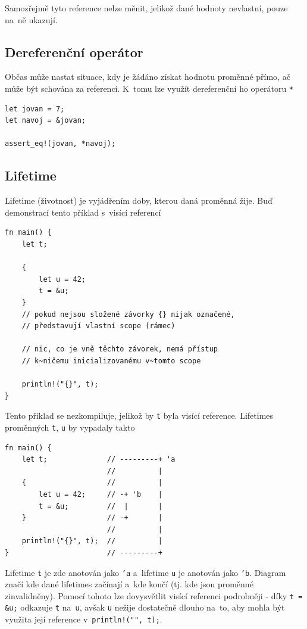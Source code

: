 \documentclass[a4paper, 12pt]{article} %
\newcommand{\rust}[1]{\texttt{#1}}
\begin{document}
			Samozřejmě tyto reference nelze měnit, jelikož dané hodnoty nevlastní, pouze na~ně ukazují.


		\subsection{Dereferenční operátor}
			Občas může nastat situace, kdy je žádáno získat hodnotu proměnné přímo, ač může být schována za referencí. K~tomu lze využít dereferenční ho operátoru \rust{*}
			\begin{verbatim} 
let jovan = 7;
let navoj = &jovan;

assert_eq!(jovan, *navoj);
			\end{verbatim}
		
		\subsection{Lifetime}
			Lifetime (životnost) je vyjádřením doby, kterou daná proměnná žije. Buď demonstrací tento příklad s~visící referencí
			\begin{verbatim}
fn main() {
	let t;

	{
		let u = 42;
		t = &u;
	}
	// pokud nejsou složené závorky {} nijak označené,
	// představují vlastní scope (rámec)

	// nic, co je vně těchto závorek, nemá přístup
	// k~ničemu inicializovanému v~tomto scope

	println!("{}", t);
}
			\end{verbatim}
			
			Tento příklad se nezkompiluje, jelikož by \rust{t} byla visící reference. Lifetimes proměnných \rust{t}, \rust{u} by vypadaly takto
			\begin{verbatim}
fn main() {
	let t;              // ---------+ 'a
						//          |
	{                   //          |
		let u = 42;     // -+ 'b    |
		t = &u;         //  |       |
	}                   // -+       |
						//          |
	println!("{}", t);  //          |
}                       // ---------+
			\end{verbatim}
			
			Lifetime \rust{t} je zde anotován jako \rust{'a} a~lifetime \rust{u} je anotován jako \rust{'b}. Diagram značí kde dané lifetimes začínají a~kde končí (tj. kde jsou proměnné zinvalidněny). Pomocí tohoto lze dovysvětlit visící referenci podrobněji - díky \rust{t = &u;} odkazuje \rust{t} na~\rust{u}, avšak \rust{u} nežije dostatečně dlouho na~to, aby mohla být využita její reference v~\rust{println!("{}", t);}.
			
\end{document}

